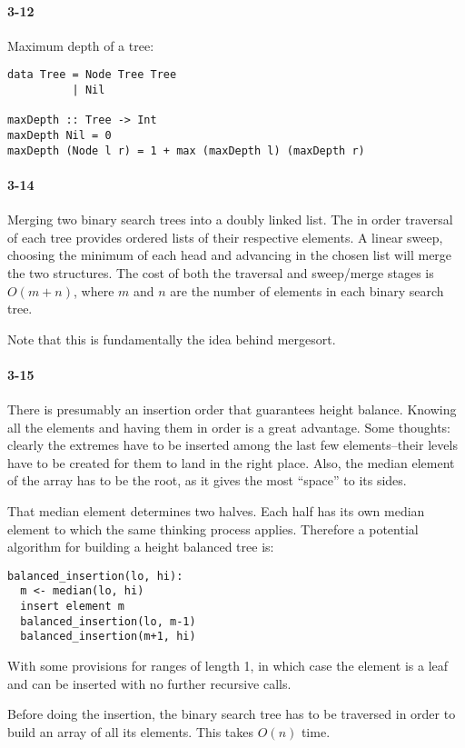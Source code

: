 \documentclass{report}
\begin{document}
\paragraph{3-12} Maximum depth of a tree:
\begin{lstlisting}
data Tree = Node Tree Tree
          | Nil

maxDepth :: Tree -> Int
maxDepth Nil = 0
maxDepth (Node l r) = 1 + max (maxDepth l) (maxDepth r)
\end{lstlisting}

\paragraph{3-14} Merging two binary search trees into a doubly linked list. The in order traversal of each tree provides ordered lists of their respective elements. A linear sweep, choosing the minimum of each head and advancing in the chosen list will merge the two structures. The cost of both the traversal and sweep/merge stages is $O(m+n)$, where $m$ and $n$ are the number of elements in each binary search tree.

Note that this is fundamentally the idea behind mergesort.

\paragraph{3-15} There is presumably an insertion order that guarantees height balance. Knowing all the elements and having them in order is a great advantage. Some thoughts: clearly the extremes have to be inserted among the last few elements--their levels have to be created for them to land in the right place. Also, the median element of the array has to be the root, as it gives the most ``space'' to its sides.

That median element determines two halves. Each half has its own median element to which the same thinking process applies. Therefore a potential algorithm for building a height balanced tree is:
\begin{lstlisting}
balanced_insertion(lo, hi):
  m <- median(lo, hi)
  insert element m
  balanced_insertion(lo, m-1)
  balanced_insertion(m+1, hi)
\end{lstlisting}
With some provisions for ranges of length 1, in which case the element is a leaf and can be inserted with no further recursive calls.

Before doing the insertion, the binary search tree has to be traversed in order to build an array of all its elements. This takes $O(n)$ time.
\end{document}
